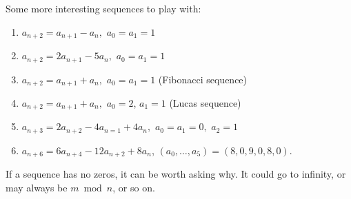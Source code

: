 Some more interesting sequences to play with:
\begin{enumerate} %
\item $a_{n+2} = a_{n+1}-a_n,$ $a_0=a_1 = 1$
\item $a_{n+2} = 2a_{n+1}-5a_n,$ $a_0=a_1=1$
\item $a_{n+2} = a_{n+1} + a_n,$ $a_0 = a_1 = 1$ (Fibonacci sequence)
\item $a_{n+2} = a_{n+1}+a_n,$ $a_0 = 2$, $a_1 = 1$ (Lucas sequence)
\item $a_{n+3} = 2a_{n+2}-4a_{n=1}+4a_n,$ $a_0=a_1=0,$ $a_2=1$
\item $a_{n+6} = 6a_{n+4}-12a_{n+2} +8a_n$, $(a_0,\dots,a_5) = (8,0,9,0,8,0)$.
\end{enumerate}
If a sequence has no zeros, it can be worth asking why. It could go to infinity, or may always be $m \bmod n$, or so on.
%
